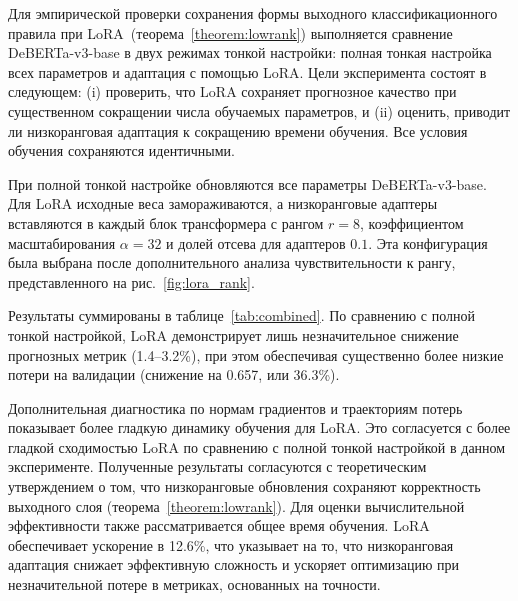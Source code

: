 Для эмпирической проверки сохранения формы выходного классификационного правила при LoRA~(теорема~\ref{theorem:lowrank}) выполняется сравнение DeBERTa-v3-base в двух режимах тонкой настройки: полная тонкая настройка всех параметров и адаптация с помощью LoRA.
Цели эксперимента состоят в следующем: (i) проверить, что LoRA сохраняет прогнозное качество при существенном сокращении числа обучаемых параметров, и
(ii) оценить, приводит ли низкоранговая адаптация к сокращению времени обучения.
Все условия обучения сохраняются идентичными.

При полной тонкой настройке обновляются все параметры DeBERTa-v3-base.
Для LoRA исходные веса замораживаются, а низкоранговые адаптеры вставляются в каждый блок трансформера с рангом $r=8$, коэффициентом масштабирования $\alpha=32$ и долей отсева для адаптеров $0.1$.
Эта конфигурация была выбрана после дополнительного анализа чувствительности к рангу, представленного на рис.~\ref{fig:lora_rank}.

Результаты суммированы в таблице~\ref{tab:combined}.
По сравнению с полной тонкой настройкой, LoRA демонстрирует лишь незначительное снижение прогнозных метрик (1.4–3.2\%), при этом обеспечивая существенно более низкие потери на валидации (снижение на 0.657, или 36.3\%).

Дополнительная диагностика по нормам градиентов и траекториям потерь показывает более гладкую динамику обучения для LoRA.
Это согласуется с более гладкой сходимостью LoRA по сравнению с полной тонкой настройкой в данном эксперименте.
Полученные результаты согласуются с теоретическим утверждением о том, что низкоранговые обновления сохраняют корректность выходного слоя (теорема~\ref{theorem:lowrank}).
Для оценки вычислительной эффективности также рассматривается общее время обучения.
LoRA обеспечивает ускорение в 12.6\%, что указывает на то, что низкоранговая адаптация снижает эффективную сложность и ускоряет оптимизацию при незначительной потере в метриках, основанных на точности.

